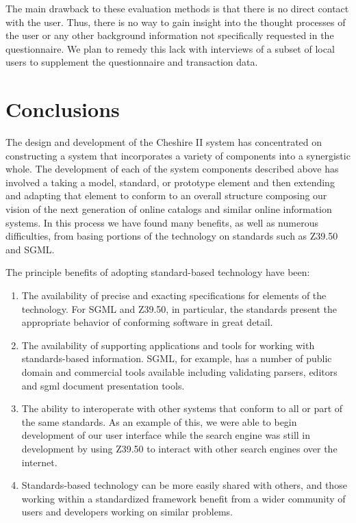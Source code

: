 The main drawback to these evaluation methods is that there is no
direct contact with the user.  Thus, there is no way to gain insight
into the thought processes of the user or any other background
information not specifically requested in the questionnaire. We plan
to remedy this lack with interviews of a subset of local users to
supplement the questionnaire and transaction data.

\section{Conclusions}

The design and development of the Cheshire II system has concentrated
on constructing a system that incorporates a variety of components
into a synergistic whole. The development of each of the system components
described above has involved a taking a model, standard, or prototype
element and then extending and adapting that element to conform to an
overall structure composing our vision of the next generation of
online catalogs and similar online information systems. In this
process we have found many benefits, as well as numerous difficulties,
from basing portions of the technology on standards such as Z39.50 and SGML. 

The principle benefits of adopting standard-based technology have been: 

\begin{enumerate}
\item The availability of precise and exacting specifications for 
elements of the technology. For SGML and Z39.50, in particular, the
standards present the appropriate behavior of conforming software in
great detail. 

\item The availability of supporting applications and tools for 
working with standards-based information. SGML, for example, has a 
number of public domain and commercial tools available including
validating parsers, editors and sgml document presentation tools.
 
\item The ability to interoperate with other systems that conform to
all or part of the same standards. As an example of this, we were 
able to begin development of our user interface while the search engine
was still in development by using Z39.50 to interact with other 
search engines over the internet.

\item Standards-based technology can be more easily shared with others,
and those working within a standardized framework benefit from a 
wider community of users and developers working on similar problems.

\end{enumerate}

